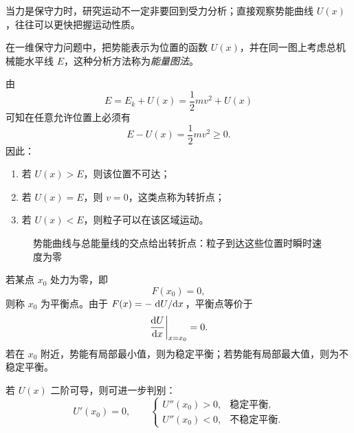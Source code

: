 当力是保守力时，研究运动不一定非要回到受力分析；直接观察势能曲线 $U(x)$，往往可以更快把握运动性质。

\begin{definition}[能量图]
在一维保守力问题中，把势能表示为位置的函数 $U(x)$，并在同一图上考虑总机械能水平线 $E$，这种分析方法称为\emph{能量图法}。
\end{definition}

由
\[
E=E_k+U(x)=\frac{1}{2}mv^2+U(x)
\]
可知在任意允许位置上必须有
\[
E-U(x)=\frac{1}{2}mv^2\ge 0.
\]
因此：
\begin{enumerate}
  \item 若 $U(x)>E$，则该位置不可达；
  \item 若 $U(x)=E$，则 $v=0$，这类点称为转折点；
  \item 若 $U(x)<E$，则粒子可以在该区域运动。
\end{enumerate}

\begin{figure}[htbp]
\centering
{}
\caption{势能曲线与总能量线的交点给出转折点：粒子到达这些位置时瞬时速度为零}
\end{figure}

\begin{definition}[平衡点与稳定性]
若某点 $x_0$ 处力为零，即
\[
F(x_0)=0,
\]
则称 $x_0$ 为平衡点。由于 $F(x)=-\dv*{U}{x}$，平衡点等价于
\[
\dv{U}{x}\bigg|_{x=x_0}=0.
\]
若在 $x_0$ 附近，势能有局部最小值，则为稳定平衡；若势能有局部最大值，则为不稳定平衡。
\end{definition}

若 $U(x)$ 二阶可导，则可进一步判别：
\[
U'(x_0)=0,
\qquad
\begin{cases}
U''(x_0)>0, & \text{稳定平衡},\\[4pt]
U''(x_0)<0, & \text{不稳定平衡}.
\end{cases}
\]

